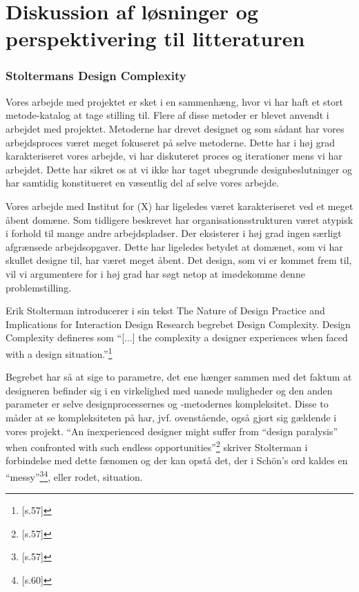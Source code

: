 \chapter{Diskussion af løsninger og perspektivering til litteraturen}

\subsection{Stoltermans Design Complexity}
Vores arbejde med projektet er sket i en sammenhæng, hvor vi har haft et stort metode-katalog at tage stilling til. Flere af disse metoder er blevet anvendt i arbejdet med projektet. Metoderne har drevet designet og som sådant har vores arbejdsproces været meget fokuseret på selve metoderne. Dette har i høj grad karakteriseret vores arbejde, vi har diskuteret proces og iterationer mens vi har arbejdet. Dette har sikret os at vi ikke har taget ubegrunde designbeslutninger og har samtidig konstitueret en væsentlig del af selve vores arbejde.

Vores arbejde med Institut for (X) har ligeledes været karakteriseret ved et meget åbent domæne. Som tidligere beskrevet har organisationsstrukturen været atypisk i forhold til mange andre arbejdspladser. Der eksisterer i høj grad ingen særligt afgrænsede arbejdsopgaver. Dette har ligeledes betydet at domænet, som vi har skullet designe til, har været meget åbent. Det design, som vi er kommet frem til, vil vi argumentere for i høj grad har søgt netop at imødekomme denne problemstilling.

Erik Stolterman introducerer i sin tekst The Nature of Design Practice and Implications
for Interaction Design Research begrebet Design Complexity. Design Complexity defineres som “[...] the complexity a designer experiences when faced with a design situation.”\footnote{\citep{Stolterman}[s.57]}

Begrebet har så at sige to parametre, det ene hænger sammen med det faktum at designeren befinder sig i en virkelighed med uanede muligheder og den anden parameter er selve designprocessernes og -metodernes kompleksitet. Disse to måder at se kompleksiteten på har, jvf. ovenstående, også gjort sig gældende i vores projekt. “An inexperienced designer might suffer from “design paralysis” when confronted with such endless opportunities”\footnote{\citep{Stolterman}[s.57]} skriver Stolterman i forbindelse med dette fænomen og der kan opstå det, der i Schön’s ord kaldes en “messy”\footnote{\citep{Stolterman}[s.57]}\footnote{\citep{Stolterman}[s.60]}, eller rodet, situation.

